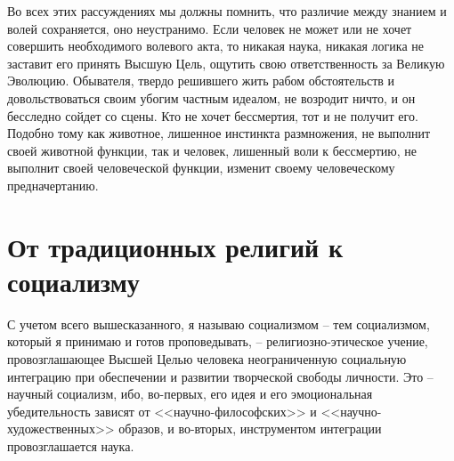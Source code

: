 \documentclass{book}
\begin{document}
Во всех этих рассуждениях мы должны помнить, что различие между знанием и волей сохраняется, оно неустранимо. Если человек не может или не хочет совершить необходимого волевого акта, то никакая наука, никакая логика не заставит его принять Высшую Цель, ощутить свою ответственность за Вели­кую Эволюцию. Обывателя, твердо решившего жить рабом об­стоятельств и довольствоваться своим убогим частным идеа­лом, не возродит ничто, и он бесследно сойдет со сцены. Кто не хочет бессмертия, тот и не получит его. Подобно тому как животное, лишенное инстинкта размножения, не выполнит сво­ей животной функции, так и человек, лишенный воли к бес­смертию, не выполнит своей человеческой функции, изменит своему человеческому предначертанию.


\section{От традиционных религий к социализму}

С учетом всего вышесказанного, я называю социализмом -- тем социализмом, который я принимаю и готов проповеды­вать, -- религиозно-этическое учение, провозглашающее Высшей Целью человека неограниченную социальную интеграцию при обеспечении и развитии творческой свободы личности. Это -- научный социализм, ибо, во-первых, его идея и его эмоциональ­ная убедительность зависят от <<научно-философских>> и <<науч­но-художественных>> образов, и во-вторых, инструментом ин­теграции провозглашается наука.
\end{document}

